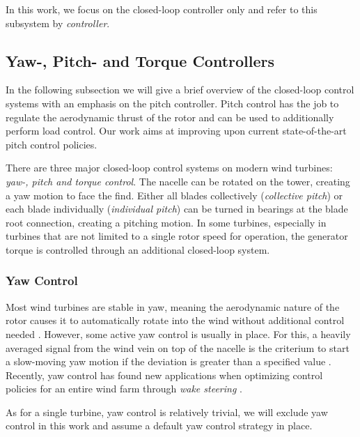 In this work, we focus on the closed-loop controller only and refer to this subsystem by \textit{controller}.

\subsection{Yaw-, Pitch- and Torque Controllers}
\label{section:background-closed-loop}

\begin{summary}
In the following subsection we will give a brief overview of the closed-loop control systems with an emphasis on the pitch controller. Pitch control has the job to regulate the aerodynamic thrust of the rotor and can be used to additionally perform load control. Our work aims at improving upon current state-of-the-art pitch control policies.
\end{summary}

There are three major closed-loop control systems on modern wind turbines: \textit{yaw-, pitch and torque control}. The nacelle can be rotated on the tower, creating a yaw motion to face the find. Either all blades collectively (\textit{collective pitch}) or each blade individually (\textit{individual pitch}) can be turned in bearings at the blade root connection, creating a pitching motion. In some turbines, especially in turbines that are not limited to a single rotor speed for operation, the generator torque is controlled through an additional closed-loop system.

\subsubsection{Yaw Control}
Most wind turbines are stable in yaw, meaning the aerodynamic nature of the rotor causes it to automatically rotate into the wind without additional control needed \cite[Chapter 3.10]{burtonWindEnergyHandbook2011}. However, some active yaw control is usually in place. For this, a heavily averaged signal from the wind vein on top of the nacelle is the criterium to start a slow-moving yaw motion if the deviation is greater than a specified value \cite[Chapter 8.2.4]{burtonWindEnergyHandbook2011}. Recently, yaw control has found new applications when optimizing control policies for an entire wind farm through \textit{wake steering} \cite{howlandWindFarmPower2019}.

As for a single turbine, yaw control is relatively trivial, we will exclude yaw control in this work and assume a default yaw control strategy in place.

